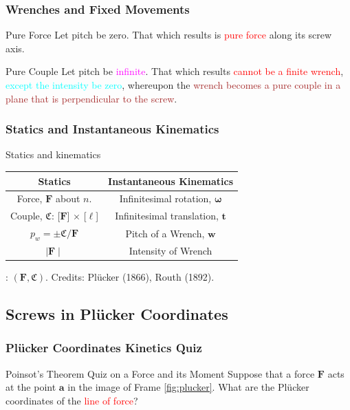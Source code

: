 \begin{frame}
	\frametitle{Wrenches and Fixed Movements}
	\begin{block}{Pure Force}
		Let pitch be \textcolor{light-blue}{zero}. That which results is \textcolor{red}{pure force} along its screw axis.
	\end{block}
	
	\begin{block}{Pure Couple}
		Let pitch be \textcolor{magenta}{infinite}. That which results \textcolor{red}{cannot be a finite wrench}, \textcolor{cyan}{except the intensity be zero}, whereupon the \textcolor{brown}{wrench becomes a pure couple in a plane that is perpendicular to the screw}.
	\end{block}
\end{frame}


\begin{frame}
	\frametitle{Statics and Instantaneous Kinematics}
	\begin{block}{Statics and kinematics}
		\begin{center}
			\begin{tabular}{||c | c||} 
				\hline
				\textbf{Statics} & \textbf{Instantaneous Kinematics}  \\ %
				\hline\hline
				Force,  $\bm{F}$ about $n$. & Infinitesimal rotation, $\bm{\omega}$ \\ 
				\hline
				Couple, $\mathfrak{C}$: [$\bm{F}$] $\times$ [$\ell$] & Infinitesimal translation, $\bm{t}$ \\
				\hline
				$p_w = \pm \mathfrak{C}/\bm{F}$ & Pitch of a Wrench, $\bm{w}$ \\
				\hline
				$\mid\bm{F} \mid$ & Intensity of Wrench \\
				\hline
			\end{tabular}
			: $(\bm{F}, \mathfrak{C})$. Credits: Pl{\"u}cker (1866), Routh (1892).
		\end{center}
	\end{block}
	
\end{frame}

\subsection{Screws in Pl{\"u}cker Coordinates}
\begin{frame}
	\frametitle{Pl{\"u}cker Coordinates Kinetics Quiz}
	\begin{block}{Poinsot's Theorem Quiz on a  Force and its Moment}
		Suppose that a force $\bm{F}$  acts at the point $\bm{a}$ in the image of Frame \ref{fig:plucker}. What are the Pl{\"u}cker coordinates of the \textcolor{red}{line of force}?
	\end{block}
\end{frame}

